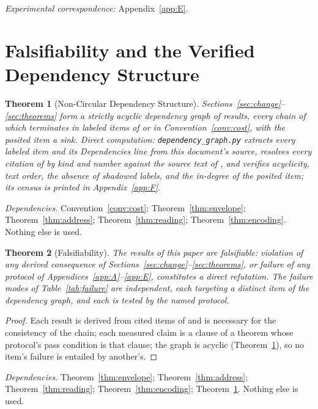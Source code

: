 \documentclass[pdflatex,sn-mathphys-num]{sn-jnl}
\theoremstyle{thmstyleone}%
\newtheorem{theorem}{Theorem}[section]
\theoremstyle{thmstyletwo}%
\theoremstyle{thmstylethree}%
\newtheorem{theorem}{Theorem}[section]
\newcommand{\PA}{\cite{Swanagon2026PA}}
\newcommand{\deps}[1]{\par\begin{sloppypar}\noindent\emph{Dependencies.} #1 Nothing else is used.\end{sloppypar}}
\begin{document}
\begin{table}[!htbp]
\centering\small
\caption{What one structural resolution returns against what the table returns (Appendix~\ref{app:E}).}
\label{tab:surplus}

\end{table}

\noindent\emph{Experimental correspondence:} Appendix~\ref{app:E}.

\section{Falsifiability and the Verified Dependency Structure}\label{sec:falsifiability}

\begin{theorem}[Non-Circular Dependency Structure]\label{thm:graph}
Sections~\ref{sec:change}--\ref{sec:theorems} form a strictly acyclic dependency graph of results, every chain of which terminates in labeled items of \PA{} or in Convention~\ref{conv:cost}, with the posited item a sink. Direct computation: \texttt{dependency\_graph.py} extracts every labeled item and its Dependencies line from this document's source, resolves every citation of \PA{} by kind and number against the source text of \PA{}, and verifies acyclicity, text order, the absence of shadowed labels, and the in-degree of the posited item; its census is printed in Appendix~\ref{app:F}.
\end{theorem}
\deps{Convention~\ref{conv:cost}; Theorem~\ref{thm:envelope}; Theorem~\ref{thm:address}; Theorem~\ref{thm:reading}; Theorem~\ref{thm:encoding}.}


\begin{theorem}[Falsifiability]\label{thm:falsifiability}
The results of this paper are falsifiable: violation of any derived consequence of Sections~\ref{sec:change}--\ref{sec:theorems}, or failure of any protocol of Appendices~\ref{app:A}--\ref{app:E}, constitutes a direct refutation. The failure modes of Table~\ref{tab:failure} are independent, each targeting a distinct item of the dependency graph, and each is tested by the named protocol.
\end{theorem}
\begin{proof}
Each result is derived from cited items of \PA{} and is necessary for the consistency of the chain; each measured claim is a clause of a theorem whose protocol's pass condition is that clause; the graph is acyclic (Theorem~\ref{thm:graph}), so no item's failure is entailed by another's.
\end{proof}
\deps{Theorem~\ref{thm:envelope}; Theorem~\ref{thm:address}; Theorem~\ref{thm:reading}; Theorem~\ref{thm:encoding}; Theorem~\ref{thm:graph}.}
\end{document}
